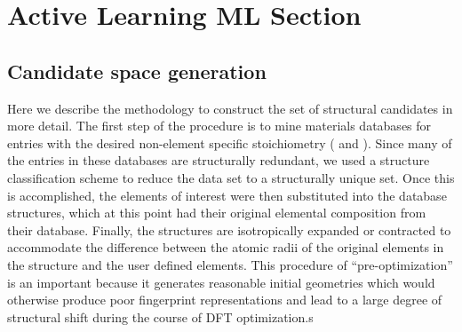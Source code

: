 

\section{Active Learning ML Section}  %
%

\subsection{Candidate space generation}  %
%


%
Here we describe the methodology to construct the set of structural candidates in more detail.
%
The first step of the procedure is to mine materials databases for entries with the desired non-element specific stoichiometry ( \ABtwo and \ABthree).
%
Since many of the entries in these databases are structurally redundant,
we used a structure classification scheme to reduce the data set to a structurally unique set.
%
Once this is accomplished, the elements of interest were then substituted into the database structures,
which at this point had their original elemental composition from their database.
%
Finally, the structures are isotropically expanded or contracted to accommodate the difference between the atomic radii of the original elements in the structure and the user defined elements.
%
This procedure of ``pre-optimization'' is an important because it generates reasonable initial geometries which would otherwise produce poor fingerprint representations and lead to a large degree of structural shift during the course of DFT optimization.s


